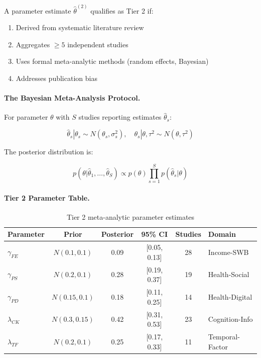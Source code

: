 \begin{definition}
A parameter estimate $\hat{\theta}^{(2)}$ qualifies as Tier 2 if:
\begin{enumerate}
    \item Derived from systematic literature review
    \item Aggregates $\geq 5$ independent studies
    \item Uses formal meta-analytic methods (random effects, Bayesian)
    \item Addresses publication bias
\end{enumerate}
\end{definition}

\paragraph{The Bayesian Meta-Analysis Protocol.}

For parameter $\theta$ with $S$ studies reporting estimates $\hat{\theta}_s$:

\begin{equation}
\hat{\theta}_s | \theta_s \sim N(\theta_s, \sigma_s^2), \quad \theta_s | \theta, \tau^2 \sim N(\theta, \tau^2)
\end{equation}

The posterior distribution is:

\begin{equation}
p(\theta | \hat{\theta}_1, \ldots, \hat{\theta}_S) \propto p(\theta) \prod_{s=1}^S p(\hat{\theta}_s | \theta)
\end{equation}

\paragraph{Tier 2 Parameter Table.}

\begin{table}[h]
\centering
\small
\begin{tabular}{lccccl}
\toprule
\textbf{Parameter} & \textbf{Prior} & \textbf{Posterior} & \textbf{95\% CI} & \textbf{Studies} & \textbf{Domain} \\
\midrule
$\gamma_{FE}$ & $N(0.1, 0.1)$ & 0.09 & [0.05, 0.13] & 28 & Income-SWB \\
$\gamma_{PS}$ & $N(0.2, 0.1)$ & 0.28 & [0.19, 0.37] & 19 & Health-Social \\
$\gamma_{PD}$ & $N(0.15, 0.1)$ & 0.18 & [0.11, 0.25] & 14 & Health-Digital \\
$\lambda_{CK}$ & $N(0.3, 0.15)$ & 0.42 & [0.31, 0.53] & 23 & Cognition-Info \\
$\lambda_{TF}$ & $N(0.2, 0.1)$ & 0.25 & [0.17, 0.33] & 11 & Temporal-Factor \\
\bottomrule
\end{tabular}
\caption{Tier 2 meta-analytic parameter estimates}
\label{tab:tier2-estimates}
\end{table}

